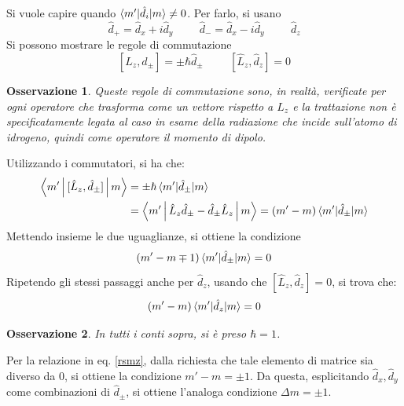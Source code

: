 \documentclass[11pt, a4paper]{scrartcl} %
\numberwithin{equation}{subsection}
\theoremstyle{style2}
\newtheorem{osservazione}{Osservazione}[section]
\theoremstyle{style1}
\newenvironment{boxenv}[1][]{
    \begin{eqbox}[#1]
    }{
   \end{eqbox}
}
\begin{document}
\begin{enumerate}[(a).]
		Si vuole capire quando $\braket{m'|\hat{d}_i |m} \neq 0$.
		Per farlo, si usano 
		\[
		\hat{d}_+ = \hat{d}_x + i \hat{d}_y \hspace{1cm} \hat{d}_-= \hat{d}_x - i \hat{d}_y \hspace{1cm} \hat{d}_z
		\] 
		Si possono mostrare le regole di commutazione 
		\[
			[\hat{L}_z, \hat{d}_{\pm} ] = \pm \hbar  \hat{d}_\pm \hspace{1cm} [\hat{L}_z , \hat{d}_z] = 0 
		\] 
	\begin{osservazione}
	Queste regole di commutazione sono, in realt\`a, verificate per ogni operatore che trasforma come un vettore rispetto a $\hat{L}_z$ e la trattazione non \`e specificatamente legata al caso in esame della radiazione che incide sull'atomo di idrogeno, quindi come operatore il momento di dipolo.
	\end{osservazione}	
Utilizzando i commutatori, si ha che:
\[
\begin{split}
	\Braket{m'|[\hat{L}_z,  \hat{d}_{\pm} ]|m} &= \pm \hbar \braket{m'|\hat{d}_\pm|m} \\
						   &= \Braket{m'|\hat{L}_z \hat{d}_\pm - \hat{d}_\pm \hat{L}_z|m} = (m' - m) \braket{m'|\hat{d}_\pm|m} 
\end{split}
\] 
Mettendo insieme le due uguaglianze, si ottiene la condizione
\begin{equation}\label{rsmz}
	(m'-m \mp 1) \braket{m'|\hat{d}_\pm|m} = 0
\end{equation}
Ripetendo gli stessi passaggi anche per $\hat{d}_z$, usando che $[\hat{L}_z, \hat{d}_z] = 0$, si trova che:
\begin{equation}\label{rsmz2}
	(m' - m) \braket{m'|\hat{d}_z|m} = 0
\end{equation}
\begin{osservazione}
In tutti i conti sopra, si \`e preso $\hbar  = 1$.
\end{osservazione}
\begin{boxenv}[]
Per la relazione in eq. \ref{rsmz}, dalla richiesta che tale elemento di matrice sia diverso da $0$, si ottiene la condizione $m ' - m = \pm 1$.
Da questa, esplicitando $\hat{d}_x, \hat{d}_y$ come combinazioni di $\hat{d}_\pm$, si ottiene l'analoga condizione $\Delta m = \pm 1$.


\end{boxenv}
\end{enumerate}
\end{document}
